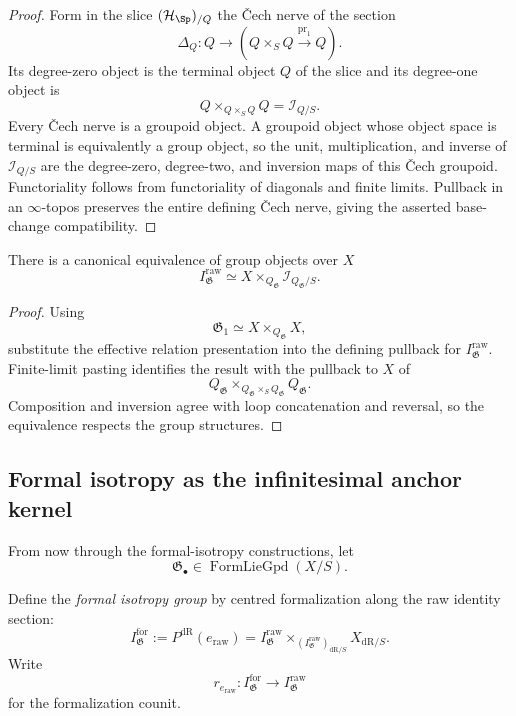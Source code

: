 \begin{proof}
Form in the slice $(\mathcal H_{\Sp})_{/Q}$ the \v{C}ech nerve of the section
\[
    \Delta_Q:
    Q\longrightarrow
    (Q\times_SQ\xrightarrow{\operatorname{pr}_1}Q).
\]
Its degree-zero object is the terminal object $Q$ of the slice and its
degree-one object is
\[
    Q\times_{Q\times_SQ}Q
    =
    \mathcal I_{Q/S}.
\]
Every \v{C}ech nerve is a groupoid object.  A groupoid object whose object
space is terminal is equivalently a group object, so the unit, multiplication,
and inverse of $\mathcal I_{Q/S}$ are the degree-zero, degree-two, and inversion
maps of this \v{C}ech groupoid.  Functoriality follows from functoriality of
diagonals and finite limits.  Pullback in an $\infty$-topos preserves the
entire defining \v{C}ech nerve, giving the asserted base-change compatibility.
\end{proof}

\begin{proposition}
\label{prop:isotropy-inertia}
There is a canonical equivalence of group objects over $X$
\[
    I^{\mathrm{raw}}_{\mathfrak G}
    \simeq
    X\times_{Q_{\mathfrak G}}
    \mathcal I_{Q_{\mathfrak G}/S}.
\]
\end{proposition}

\begin{proof}
Using
\[
    \mathfrak G_1
    \simeq
    X\times_{Q_{\mathfrak G}}X,
\]
substitute the effective relation presentation into the defining pullback for
$I^{\mathrm{raw}}_{\mathfrak G}$.  Finite-limit pasting identifies the
result with the pullback to $X$ of
\[
    Q_{\mathfrak G}
    \times_{Q_{\mathfrak G}\times_SQ_{\mathfrak G}}
    Q_{\mathfrak G}.
\]
Composition and inversion agree with loop concatenation and reversal, so the
equivalence respects the group structures.
\end{proof}

\subsection{Formal isotropy as the infinitesimal anchor kernel}

From now through the formal-isotropy constructions, let
\[
    \mathfrak G_\bullet\in\operatorname{FormLieGpd}(X/S).
\]

\begin{definition}
\label{def:isotropy-formal-group}
Define the \emph{formal isotropy group} by centred formalization along the raw
identity section:
\[
    I^{\mathrm{for}}_{\mathfrak G}
    :=
    P^{\mathrm{dR}}(e_{\mathrm{raw}})
    =
    I^{\mathrm{raw}}_{\mathfrak G}
    \times_{
        (I^{\mathrm{raw}}_{\mathfrak G})_{\mathrm{dR}/S}
    }
    X_{\mathrm{dR}/S}.
\]
Write
\[
    r_{e_{\mathrm{raw}}}:
    I^{\mathrm{for}}_{\mathfrak G}
    \longrightarrow
    I^{\mathrm{raw}}_{\mathfrak G}
\]
for the formalization counit.
\end{definition}

